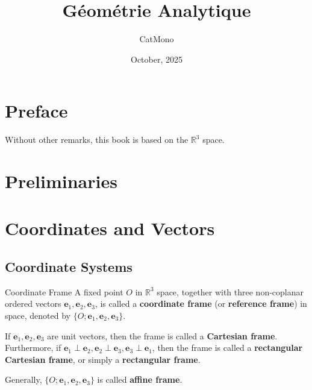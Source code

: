 \documentclass[11pt]{../../TexTemplate/elegantbook} %
\title{Géométrie Analytique} %
\author{CatMono} %
\date{October, 2025} %
\begin{document}
\maketitle %

\frontmatter        %
\tableofcontents    %

\chapter{Preface}   %
Without other remarks, this book is based on the \(\mathbb{R}^{3}\) space.

\mainmatter         %

\chapter{Preliminaries} %

\chapter{Coordinates and Vectors}
\section{Coordinate Systems} %
\begin{definition}{Coordinate Frame}
    A fixed point \(O\) in \(\mathbb{R}^{3}\) space,
    together with three non-coplanar ordered vectors \(\mathbf{e}_{1}, \mathbf{e}_{2}, \mathbf{e}_{3}\),
    is called a \textbf{coordinate frame} (or \textbf{reference frame}) in space,
    denoted by \(\{O ; \mathbf{e}_{1}, \mathbf{e}_{2}, \mathbf{e}_{3}\}\).

    If \(\mathbf{e}_{1}, \mathbf{e}_{2}, \mathbf{e}_{3}\) are unit vectors,
    then the frame is called a \textbf{Cartesian frame}.
    Furthermore, if \(\mathbf{e}_{1} \perp \mathbf{e}_{2}, \mathbf{e}_{2} \perp \mathbf{e}_{3}, \mathbf{e}_{3} \perp \mathbf{e}_{1}\),
    then the frame is called a \textbf{rectangular Cartesian frame}, or simply a \textbf{rectangular frame}.

    Generally, \(\{O ; \mathbf{e}_{1}, \mathbf{e}_{2}, \mathbf{e}_{3}\}\) is called \textbf{affine frame}.
\end{definition}
\end{document}
